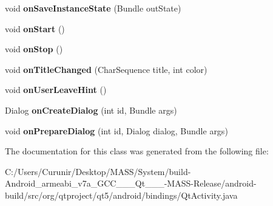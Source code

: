 \begin{DoxyCompactItemize}
void {\bfseries on\+Save\+Instance\+State} (Bundle out\+State)
\item 
\mbox{\label{classorg_1_1qtproject_1_1qt5_1_1android_1_1bindings_1_1_qt_activity_a5d86c0f23d31274741575dbf916814d1}} 
void {\bfseries on\+Start} ()
\item 
\mbox{\label{classorg_1_1qtproject_1_1qt5_1_1android_1_1bindings_1_1_qt_activity_a2fa87ac6c9b33749654fb05211d7d894}} 
void {\bfseries on\+Stop} ()
\item 
\mbox{\label{classorg_1_1qtproject_1_1qt5_1_1android_1_1bindings_1_1_qt_activity_ab084cdaffe2c7638d6c7e1255aecec3c}} 
void {\bfseries on\+Title\+Changed} (Char\+Sequence title, int color)
\item 
\mbox{\label{classorg_1_1qtproject_1_1qt5_1_1android_1_1bindings_1_1_qt_activity_a86f980854e12f7cf5c8a91f7cbd875d7}} 
void {\bfseries on\+User\+Leave\+Hint} ()
\item 
\mbox{\label{classorg_1_1qtproject_1_1qt5_1_1android_1_1bindings_1_1_qt_activity_a68654d4382feda0419fd1a59792b3643}} 
Dialog {\bfseries on\+Create\+Dialog} (int id, Bundle args)
\item 
\mbox{\label{classorg_1_1qtproject_1_1qt5_1_1android_1_1bindings_1_1_qt_activity_aa4466dc136a61b68aaf83cf3a5a9827d}} 
void {\bfseries on\+Prepare\+Dialog} (int id, Dialog dialog, Bundle args)
\end{DoxyCompactItemize}


The documentation for this class was generated from the following file\+:\begin{DoxyCompactItemize}
\item 
C\+:/\+Users/\+Curunir/\+Desktop/\+M\+A\+S\+S/\+System/build-\/\+Android\+\_\+armeabi\+\_\+v7a\+\_\+\+G\+C\+C\+\_\+\_\+\_\+\+Qt\+\_\+\_\+\_-\/\+M\+A\+S\+S-\/\+Release/android-\/build/src/org/qtproject/qt5/android/bindings/Qt\+Activity.\+java\end{DoxyCompactItemize}
